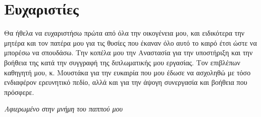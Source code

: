 \section*{Ευχαριστίες}

Θα ήθελα να ευχαριστήσω πρώτα από όλα την οικογένεια μου, και ειδικότερα την μητέρα και τον πατέρα μου για τις θυσίες που έκαναν όλο αυτό το καιρό έτσι ώστε να μπορέσω να σπουδάσω. Την κοπέλα μου την Αναστασία για την υποστήριξη και την βοήθεια της κατά την συγγραφή της διπλωματικής μου εργασίας. Τον επιβλέπων καθηγητή μου, κ. Μουστάκα για την ευκαιρία που μου έδωσε να ασχοληθώ με τόσο ενδιαφέρον ερευνητικό πεδίο, αλλά και για την άψογη συνεργασία και βοήθεια που πρόσφερε.

\thispagestyle{empty}
\clearpage

\begin{center}
  \null\vfill
  \large{{\em Αφιερωμένο στην μνήμη του παππού μου}}
  \vspace{2cm}
  \null\vfill
\end{center}

\thispagestyle{empty}